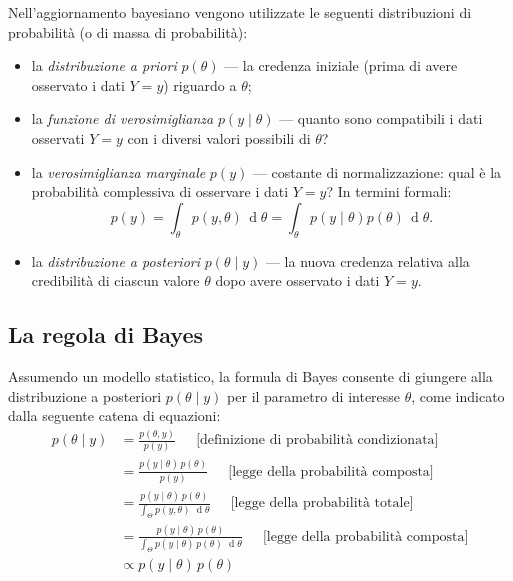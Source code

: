 \documentclass[
  10pt,
  italian,
  a4paper,
  extrafontsizes,onecolumn,openright
  ]{memoir}
\providecommand{\tightlist}{%
  \setlength{\itemsep}{0pt}\setlength{\parskip}{0pt}}
\begin{document}
Nell'aggiornamento bayesiano vengono utilizzate le seguenti distribuzioni di probabilità (o di massa di probabilità):

\begin{itemize}
\tightlist
\item
  la \emph{distribuzione a priori} \(p(\theta)\) --- la credenza iniziale (prima di avere osservato i dati \(Y = y\)) riguardo a \(\theta\);
\item
  la \emph{funzione di verosimiglianza} \(p(y \mid \theta)\) --- quanto sono compatibili i dati osservati \(Y = y\) con i diversi valori possibili di \(\theta\)?
\item
  la \emph{verosimiglianza marginale} \(p(y)\) --- costante di normalizzazione: qual è la probabilità complessiva di osservare i dati \(Y = y\)? In termini formali:
  \[
  p(y) = \int_\theta p(y, \theta) \,\operatorname {d}\!\theta = \int_\theta p(y \mid \theta) p(\theta) \,\operatorname {d}\!\theta.
  \]
\item
  la \emph{distribuzione a posteriori} \(p(\theta \mid y)\) --- la nuova credenza relativa alla credibilità di ciascun valore \(\theta\) dopo avere osservato i dati \(Y = y\).
\end{itemize}

\hypertarget{la-regola-di-bayes}{%
\subsection{La regola di Bayes}\label{la-regola-di-bayes}}

Assumendo un modello statistico, la formula di Bayes consente di giungere alla distribuzione a posteriori \(p(\theta \mid y)\) per il parametro di interesse \(\theta\), come indicato dalla seguente catena di equazioni:
\begin{align}
p(\theta \mid y)  &= \displaystyle \frac{p(\theta,y)}{p(y)}
 \ \ \ \ \ \mbox{ [definizione di probabilità condizionata]}
\\
&= \displaystyle \frac{p(y \mid \theta) \, p(\theta)}{p(y)}
 \ \ \ \ \ \mbox{ [legge della probabilità composta]}
\\
&=  \displaystyle \frac{p(y \mid\theta) \, p(\theta)}
                        {\int_{\Theta} p(y,\theta) \, \,\operatorname {d}\!\theta}
 \ \ \ \ \ \mbox{ [legge della probabilità totale]}
\\
&= \displaystyle \frac{p(y \mid\theta) \, p(\theta)}
                        {\int_{\Theta} p(y \mid\theta) \, p(\theta) \, \,\operatorname {d}\!\theta}
 \ \ \ \ \ \mbox{ [legge della probabilità composta]}
\\
& \propto \displaystyle p(y \mid\theta) \, p(\theta)
\label{eq:bayesmodel}
\end{align}
\end{document}
